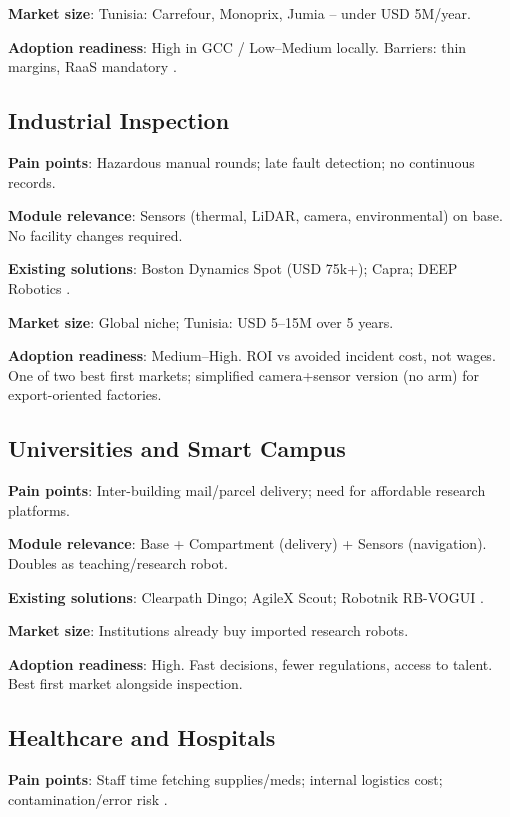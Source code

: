 \textbf{Market size}: Tunisia: Carrefour, Monoprix, Jumia -- under USD 5M/year.

\textbf{Adoption readiness}: High in GCC / Low--Medium locally. Barriers: thin margins, RaaS mandatory \cite{builtin_raas}.

\subsection{Industrial Inspection}

\textbf{Pain points}: Hazardous manual rounds; late fault detection; no continuous records.

\textbf{Module relevance}: Sensors (thermal, LiDAR, camera, environmental) on base. No facility changes required.

\textbf{Existing solutions}: Boston Dynamics Spot (USD 75k+); Capra; DEEP Robotics \cite{standardbots_amr,generationrobots_amr}.

\textbf{Market size}: Global niche; Tunisia: USD 5--15M over 5 years.

\textbf{Adoption readiness}: Medium--High. ROI vs avoided incident cost, not wages. One of two best first markets; simplified camera+sensor version (no arm) for export-oriented factories.

\subsection{Universities and Smart Campus}

\textbf{Pain points}: Inter-building mail/parcel delivery; need for affordable research platforms.

\textbf{Module relevance}: Base + Compartment (delivery) + Sensors (navigation). Doubles as teaching/research robot.

\textbf{Existing solutions}: Clearpath Dingo; AgileX Scout; Robotnik RB-VOGUI \cite{generationrobots_amr,robotnik_kairos}.

\textbf{Market size}: Institutions already buy imported research robots.

\textbf{Adoption readiness}: High. Fast decisions, fewer regulations, access to talent. Best first market alongside inspection.

\subsection{Healthcare and Hospitals}

\textbf{Pain points}: Staff time fetching supplies/meds; internal logistics cost; contamination/error risk \cite{researchgate_hospital}.

